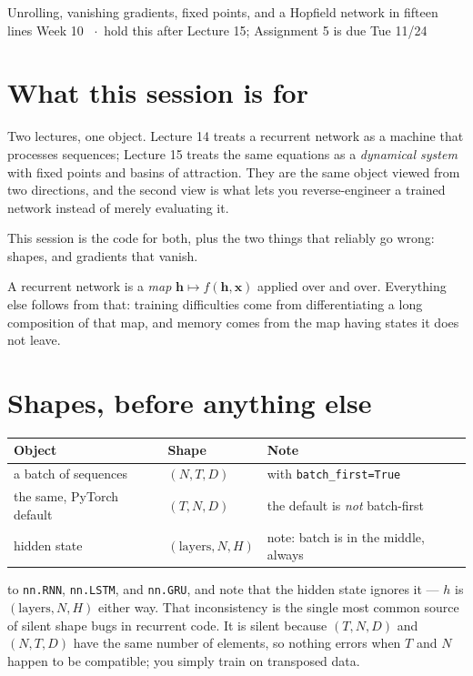 \documentclass[11pt]{article}
\begin{document}
  {Unrolling, vanishing gradients, fixed points, and a Hopfield network in fifteen lines}
  {Week 10 \ $\cdot$\ hold this after Lecture 15; Assignment 5 is due Tue 11/24}

\section*{What this session is for}

Two lectures, one object. Lecture 14 treats a recurrent network as a machine
that processes sequences; Lecture 15 treats the same equations as a
\emph{dynamical system} with fixed points and basins of attraction. They are the
same object viewed from two directions, and the second view is what lets you
reverse-engineer a trained network instead of merely evaluating it.

This session is the code for both, plus the two things that reliably go wrong:
shapes, and gradients that vanish.

\begin{keybox}
 A recurrent network is a \emph{map} $\boldsymbol{h} \mapsto
f(\boldsymbol{h}, \boldsymbol{x})$ applied over and over. Everything else
follows from that: training difficulties come from differentiating a long
composition of that map, and memory comes from the map having states it does not
leave.
\end{keybox}

\section{Shapes, before anything else}

\begin{center}
\begin{tabular}{@{}lll@{}}
\toprule
Object & Shape & Note \\
\midrule
a batch of sequences & $(N, T, D)$ & with \texttt{batch\_first=True} \\
the same, PyTorch default & $(T, N, D)$ & the default is \emph{not} batch-first \\
hidden state & $(\text{layers}, N, H)$ & note: batch is in the middle, always \\
\bottomrule
\end{tabular}
\end{center}

\begin{keybox}
 to \texttt{nn.RNN},
\texttt{nn.LSTM}, and \texttt{nn.GRU}, and note that the hidden state ignores it
--- $h$ is $(\text{layers}, N, H)$ either way. That inconsistency is the single
most common source of silent shape bugs in recurrent code. It is silent because
$(T, N, D)$ and $(N, T, D)$ have the same number of elements, so nothing errors
when $T$ and $N$ happen to be compatible; you simply train on transposed data.
\end{keybox}
\end{document}
